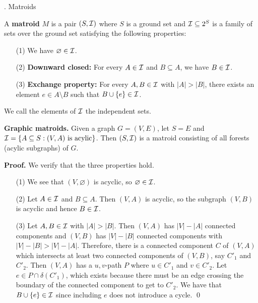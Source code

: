 \documentclass{article}
\begin{document}
\newpage 
\begin{center}
    {. Matroids}
\end{center}

A {\bf matroid} $M$ is a pair $(S, {\cal I})$ where $S$ is a ground set and 
${\cal I} \subseteq 2^S$ is a family of sets over the ground set satisfying 
the following properties: 
\begin{enumerate}
    \item [(1)] We have $\varnothing \in {\cal I}$. 
    \item [(2)] {\bf Downward closed:} For every $A \in {\cal I}$ and 
    $B \subseteq A$, we have $B \in {\cal I}$. 
    \item [(3)] {\bf Exchange property:} For every $A, B \in {\cal I}$ 
    with $|A| > |B|$, there exists an element $e \in A \setminus B$ such that 
    $B \cup \{e\} \in {\cal I}$. 
\end{enumerate}
We call the elements of ${\cal I}$ the independent sets. 

{\color{violet}
{\bf Graphic matroids.} Given a graph $G = (V, E)$, let $S = E$ and 
${\cal I} = \{A \subseteq S : (V, A) \text{ is acylic}\}$. Then 
$(S, {\cal I})$ is a matroid consisting of all forests (acylic subgraphs) of $G$.
}

{\color{blue}
{\bf Proof.} We verify that the three properties hold.
\begin{enumerate}
    \item [(1)] We see that $(V, \varnothing)$ is acyclic, so $\varnothing \in {\cal I}$. 
    \item [(2)] Let $A \in {\cal I}$ and $B \subseteq A$. Then $(V, A)$ is acyclic, 
    so the subgraph $(V, B)$ is acyclic and hence $B \in {\cal I}$. 
    \item [(3)] Let $A, B \in {\cal I}$ with $|A| > |B|$. Then $(V, A)$ 
    has $|V| - |A|$ connected components and $(V, B)$ has $|V| - |B|$ 
    connected components with $|V| - |B| > |V| - |A|$. Therefore, 
    there is a connected component $C$ of $(V, A)$ which intersects 
    at least two connected components of $(V, B)$, say $C'_1$ and $C'_2$. 
    Then $(V, A)$ has a $u, v$-path $P$ where $u \in C'_1$ and $v \in C'_2$. 
    Let $e \in P \cap \delta(C'_1)$, which exists because there must be 
    an edge crossing the boundary of the connected component to get to $C'_2$. 
    We have that $B \cup \{e\} \in {\cal I}$ since including $e$ does 
    not introduce a cycle. \qed
\end{enumerate}
}
\end{document}
